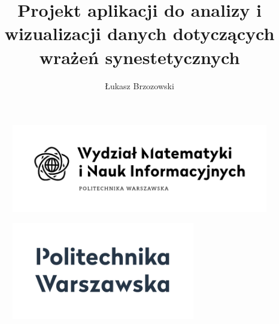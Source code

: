 \documentclass[12pt]{article}
\begin{document}
\title{Projekt aplikacji do analizy i wizualizacji danych dotyczących wrażeń synestetycznych}
\author{Łukasz Brzozowski}
\maketitle
\begin{figure}[ht!]
	\centering
	\includegraphics[width=\textwidth]{MiNI.png}
\end{figure}
\begin{figure}[ht!]
	\centering
	\includegraphics[width=8cm]{Pw.png}
\end{figure}
\pagebreak
\end{document}
